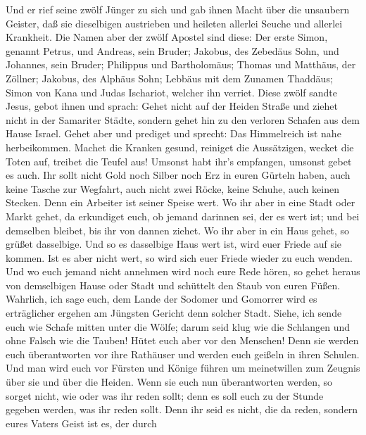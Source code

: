  Und er rief seine zwölf Jünger zu sich und gab ihnen Macht
über die unsaubern Geister, daß sie dieselbigen austrieben und heileten
allerlei Seuche und allerlei Krankheit.  Die Namen aber der
zwölf Apostel sind diese: Der erste Simon, genannt Petrus, und Andreas,
sein Bruder; Jakobus, des Zebedäus Sohn, und Johannes, sein Bruder;
 Philippus und Bartholomäus; Thomas und Matthäus, der
Zöllner; Jakobus, des Alphäus Sohn; Lebbäus mit dem Zunamen Thaddäus;
 Simon von Kana und Judas Ischariot, welcher ihn verriet.
 Diese zwölf sandte Jesus, gebot ihnen und sprach: Gehet
nicht auf der Heiden Straße und ziehet nicht in der Samariter Städte,
 sondern gehet hin zu den verloren Schafen aus dem Hause
Israel.  Gehet aber und prediget und sprecht: Das
Himmelreich ist nahe herbeikommen.  Machet die Kranken
gesund, reiniget die Aussätzigen, wecket die Toten auf, treibet die
Teufel aus! Umsonst habt ihr's empfangen, umsonst gebet es auch.
 Ihr sollt nicht Gold noch Silber noch Erz in euren Gürteln
haben,  auch keine Tasche zur Wegfahrt, auch nicht zwei
Röcke, keine Schuhe, auch keinen Stecken. Denn ein Arbeiter ist seiner
Speise wert.  Wo ihr aber in eine Stadt oder Markt gehet,
da erkundiget euch, ob jemand darinnen sei, der es wert ist; und bei
demselben bleibet, bis ihr von dannen ziehet.  Wo ihr aber
in ein Haus gehet, so grüßet dasselbige.  Und so es
dasselbige Haus wert ist, wird euer Friede auf sie kommen. Ist es aber
nicht wert, so wird sich euer Friede wieder zu euch wenden.
 Und wo euch jemand nicht annehmen wird noch eure Rede
hören, so gehet heraus von demselbigen Hause oder Stadt und schüttelt
den Staub von euren Füßen.  Wahrlich, ich sage euch, dem
Lande der Sodomer und Gomorrer wird es erträglicher ergehen am Jüngsten
Gericht denn solcher Stadt.  Siehe, ich sende euch wie
Schafe mitten unter die Wölfe; darum seid klug wie die Schlangen und
ohne Falsch wie die Tauben!  Hütet euch aber vor den
Menschen! Denn sie werden euch überantworten vor ihre Rathäuser und
werden euch geißeln in ihren Schulen.  Und man wird euch
vor Fürsten und Könige führen um meinetwillen zum Zeugnis über sie und
über die Heiden.  Wenn sie euch nun überantworten werden,
so sorget nicht, wie oder was ihr reden sollt; denn es soll euch zu der
Stunde gegeben werden, was ihr reden sollt.  Denn ihr seid
es nicht, die da reden, sondern eures Vaters Geist ist es, der durch
